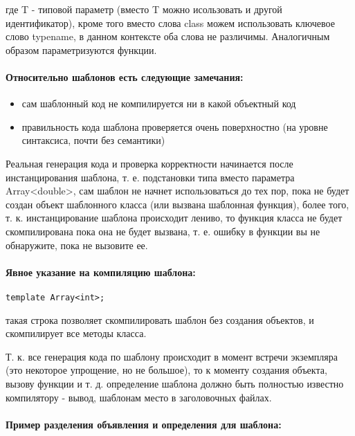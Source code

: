 где T - типовой параметр (вместо T можно исользовать и другой идентификатор), кроме того вместо слова class можем использовать ключевое слово typename, в
данном контексте оба слова не различимы. Аналогичным образом параметризуются функции.

\paragraph{Относительно шаблонов есть следующие замечания:}

\begin{itemize}
\item сам шаблонный код не компилируется ни в какой объектный код

\item правильность кода шаблона проверяется очень поверхностно (на уровне синтаксиса, почти без семантики)
\end{itemize}
	
Реальная генерация кода и проверка корректности начинается после инстанцирования шаблона, т. е. подстановки типа вместо параметра Array<double>, сам шаблон
не начнет использоваться до тех пор, пока не будет создан объект шаблонного класса (или вызвана шаблонная функция), более того, т. к. инстанцирование шаблона
происходит лениво, то функция класса не будет скомпилирована пока она не будет вызвана, т. е. ошибку в функции вы не обнаружите, пока не вызовите ее.

\paragraph{Явное указание на компиляцию шаблона:}

\begin{lstlisting}
template Array<int>;
\end{lstlisting}

такая строка позволяет скомпилировать шаблон без создания объектов, и скомпилирует все методы класса.

Т. к. все генерация кода по шаблону происходит в момент встречи экземпляра (это некоторое упрощение, но не большое), то к моменту создания объекта, вызову функции
и т. д. определение шаблона должно быть полностью известно компилятору - вывод, шаблонам место в заголовочных файлах.

\paragraph{Пример разделения объявления и определения для шаблона:}

